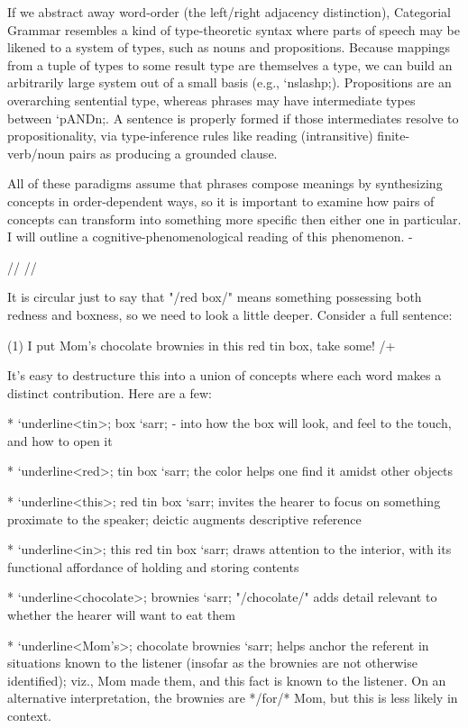 If we abstract away word-order (the left/right adjacency distinction), 
Categorial Grammar resembles a kind of type-theoretic syntax 
where parts of speech may be likened to a system of types, 
such as nouns and propositions.  Because mappings from a tuple 
of types to some result type are themselves a type, 
we can build an arbitrarily large system 
out of a small basis (e.g., `nslashp;).  
Propositions are an overarching sentential type, 
whereas phrases may have intermediate types between 
`pANDn;.  A sentence is properly 
formed if those intermediates resolve to propositionality, 
via type-inference rules like reading (intransitive) 
finite-verb/noun 
pairs as producing a grounded clause.   

All of these paradigms assume that phrases compose 
meanings by synthesizing concepts in order-dependent 
ways, so it is important to examine how pairs of 
concepts can transform into something more specific 
then either one in particular.  I will outline a 
cognitive-phenomenological reading of this phenomenon. -%

// //

It is circular just 
to say that "/red box/" means something possessing 
both redness and boxness, so we need to look a 
little deeper.  Consider a full sentence:

(1)  I put Mom's chocolate brownies in this red tin box, take some!
/+

It's easy to destructure this into a union of concepts where 
each word makes a distinct contribution.  Here are a few: 


 *  `underline<tin>; box `sarr; -%
into how the box will look, and 
feel to the touch, and how to open it

 *  `underline<red>; tin box `sarr;  the color helps one find it amidst other objects

 *  `underline<this>; red tin box `sarr;  invites the hearer to focus on something proximate 
to the speaker; deictic augments descriptive reference

 *  `underline<in>; this red tin box `sarr;  draws attention to the interior, with its functional 
affordance of holding and storing contents

 *  `underline<chocolate>; brownies `sarr;  "/chocolate/" adds detail relevant to whether the 
hearer will want to eat them

 *  `underline<Mom's>; chocolate brownies `sarr;  helps anchor the referent in situations 
known to the listener (insofar as the brownies are not otherwise identified); 
viz., Mom made them, and this fact is known to the listener.  On an alternative interpretation, 
the brownies are */for/* Mom, but this is less likely in context.

